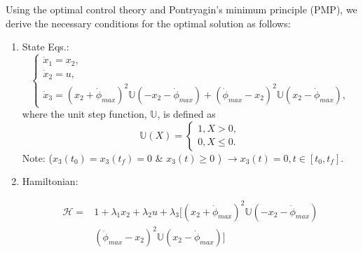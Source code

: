 \documentclass[letterpaper, paper,12pt]{AAS}		%
\begin{document}
	Using the optimal control theory and Pontryagin's minimum principle (PMP), we derive the necessary conditions for the optimal solution as follows:
	\begin{enumerate}
		\item State Eqs.:
		\begin{equation}
		\left\{
		\begin{array}{l}
		\dot{x}_1=x_2, \\
		\dot{x}_2=u, \\
		\dot{x}_3=(x_2+\dot{\phi}_{max})^2\mathbb{U}(-x_2-\dot{\phi}_{max})+(\dot{\phi}_{max}-x_2)^2\mathbb{U}(x_2-\dot{\phi}_{max}),
		\end{array}
		\right.
		\end{equation}
		where the unit step function, $\mathbb{U}$, is defined as
		\begin{equation}
		\mathbb{U}(X)=\left\{
		\begin{array}{l}
		1,   X>0, \\
		0,   X\leq 0.
		\end{array}
		\right.
		\end{equation}
		Note:  ($x_3(t_0)=x_3(t_f)=0$ \& $x_3(t)\geq 0$ ) $\rightarrow x_3(t)=0, t\in[t_0, t_f]$. 
		
		\item Hamiltonian:
		
		\begin{equation}
		\begin{split}
		\mathscr{H}=& 1+\lambda_1x_2+\lambda_2u+\lambda_3\Big[(x_2+\dot{\phi}_{max})^2\mathbb{U}(-x_2-\dot{\phi}_{max})\\
		& (\dot{\phi}_{max}-x_2)^2\mathbb{U}(x_2-\dot{\phi}_{max})\Big]
		\end{split}
		\end{equation}
		
		

\end{enumerate}
\end{document}
